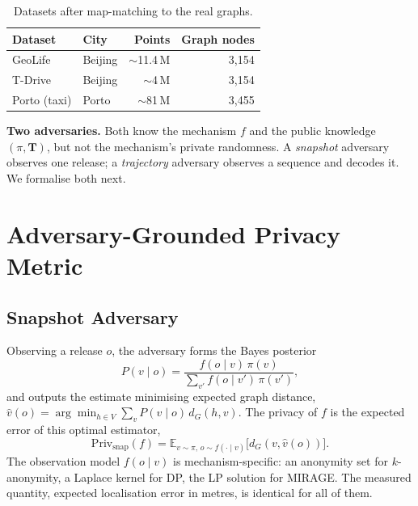 \documentclass[10pt,journal,compsoc]{IEEEtran}
\newcommand{\dG}{d_{G}}
\begin{document}
\begin{table}[t]\centering
\caption{Datasets after map-matching to the real graphs.}
\label{tab:data}
\begin{tabular}{llrr}
\toprule
Dataset & City & Points & Graph nodes \\
\midrule
GeoLife & Beijing & $\sim$11.4\,M & 3{,}154 \\
T-Drive & Beijing & $\sim$4\,M & 3{,}154 \\
Porto (taxi) & Porto & $\sim$81\,M & 3{,}455 \\
\bottomrule
\end{tabular}
\end{table}

\textbf{Two adversaries.} Both know the mechanism $f$ and the public knowledge
$(\pi,\mathbf{T})$, but not the mechanism's private randomness. A \emph{snapshot}
adversary observes one release; a \emph{trajectory} adversary observes a sequence
and decodes it. We formalise both next.

\section{Adversary-Grounded Privacy Metric}
\label{sec:adversary}
\subsection{Snapshot Adversary}
Observing a release $o$, the adversary forms the Bayes posterior
\begin{equation}
P(v\mid o)=\frac{f(o\mid v)\,\pi(v)}{\sum_{v'} f(o\mid v')\,\pi(v')},
\end{equation}
and outputs the estimate minimising expected graph distance,
$\hat v(o)=\arg\min_{h\in V}\sum_v P(v\mid o)\,\dG(h,v)$. The privacy of $f$ is the
expected error of this optimal estimator,
\begin{equation}
\mathrm{Priv}_{\mathrm{snap}}(f)=\mathbb{E}_{v\sim\pi,\,o\sim f(\cdot\mid v)}\big[\dG(v,\hat v(o))\big].
\label{eq:snapprivacy}
\end{equation}
The observation model $f(o\mid v)$ is mechanism-specific: an anonymity set for
$k$-anonymity, a Laplace kernel for DP, the LP solution for MIRAGE. The measured
quantity, expected localisation error in metres, is identical for all of them.
\end{document}
